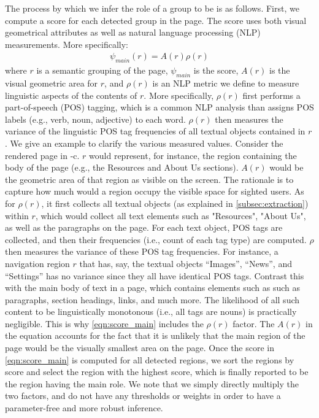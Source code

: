 The process by which we infer the role of a group to be  is as follows.
First, we compute a score for each detected group in the page. 
The score uses both visual geometrical attributes as well as natural language 
processing (NLP) measurements.
More specifically: 
\begin{align} \label{eqn:score_main}
    \psi_{main}(r) = A(r) \rho(r)
\end{align}
where $r$ is a semantic grouping of the page, $\psi_{main}$ is the score, 
$A(r)$ is the visual geometric area for $r$, and $\rho(r)$ is an NLP 
metric we define to measure linguistic aspects of the contents of $r$. 
More specifically, $\rho(r)$ 
first performs a part-of-speech (POS) tagging, which is a common NLP analysis 
than assigns POS labels (e.g., verb, noun, adjective) to each word. 
$\rho(r)$ then measures the variance of the linguistic POS tag frequencies 
of all textual objects contained in $r$.  
We give an example to clarify the various measured values. 
Consider the rendered page in -c. 
$r$ would represent, for instance, the region containing the 
body of the page (e.g., the Resources and About Us sections). 
$A(r)$ would be the geometric area of that region as visible on the screen. 
The rationale is to capture how much would a region occupy the 
visible space for sighted users. 
As for $\rho(r)$, it first collects all textual objects 
(as explained in \cref{subsec:extraction}) within $r$, which would 
collect all text elements such as "Resources", "About Us", as well as the 
paragraphs on the page. For each text object, POS tags are collected,  
and then their frequencies (i.e., count of each tag type) are computed. 
$\rho$ then measures the variance of these POS tag frequencies. 
For instance, a navigation region $r$ that has, say, the textual objects ``Images'', 
``News'', and ``Settings'' has no variance since they all 
have identical POS tags. Contrast this with the main body of text in a page, 
which contains elements such as such as paragraphs, 
section headings, links, and much more. The likelihood of all such content 
to be linguistically monotonous (i.e., all tags are nouns) is practically negligible.
This is why \cref{eqn:score_main} includes the $\rho(r)$ factor.
The $A(r)$ in the equation accounts for the fact that it is unlikely that the main 
region of the page would be the visually smallest area on the page. 
Once the score in \cref{eqn:score_main} is computed for all detected regions, 
we sort the regions by score and select the region with the highest score, 
which is finally reported to be the region having the main role. 
We note that we simply directly multiply the two factors, and do not have any thresholds or weights in order to have a parameter-free and more robust inference. 

